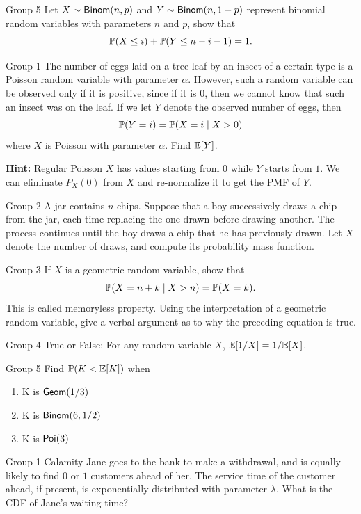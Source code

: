 \documentclass{article}
\begin{document}
\begin{problem}
    {Group 5}
    Let $X\sim\mathsf{Binom}(n,p)$ and $Y\sim\mathsf{Binom}(n,1-p)$ represent binomial random variables with parameters $n$ and $p$, show that
    \[\P{X\leq i}+\P{Y\leq n-i-1}=1.\]
\end{problem}
\begin{problem}
    {Group 1}
    The number of eggs laid on a tree leaf by an insect of a certain type is a Poisson random variable with parameter $\alpha$. However, such a random variable can be observed only if it is positive, since if it is $0$, then we cannot know that such an insect was on the leaf. If we let $Y$ denote the observed number of eggs, then
    \[\P{Y=i}=\condP{X=i}{X>0}\]
    where $X$ is Poisson with parameter $\alpha$. Find $\E{Y}$.

    \textbf{Hint:} Regular Poisson $X$ has values starting from $0$ while $Y$ starts from $1$. We can eliminate $P_X(0)$ from $X$ and re-normalize it to get the PMF of $Y$.
\end{problem}

\begin{problem}
    {Group 2}
    A jar contains $n$ chips. Suppose that a boy successively draws a chip from the jar, each time replacing the one drawn before drawing another. The process continues until the boy draws a chip that he has previously drawn. Let $X$ denote the number of draws, and compute its probability mass function.
\end{problem}

\begin{problem}
    {Group 3}
    If $X$ is a geometric random variable, show that
    \[\condP{X = n + k}{X > n} = \P{X = k}.\]
    This is called memoryless property. Using the interpretation of a geometric random variable, give a verbal argument as to why the preceding equation is true.
\end{problem}

\begin{problem}
    {Group 4}
    True or False: For any random variable $X$, $\E{1/X}=1/\E{X}$.
\end{problem}

\begin{problem}
    {Group 5}
    Find $\P{K<\E{K}}$ when
    \begin{enumerate}
        \item K is $\mathsf{Geom}(1/3)$
        \item K is $\mathsf{Binom}(6, 1/2)$
        \item K is $\mathsf{Poi}(3)$
    \end{enumerate}
\end{problem}
\begin{problem}
    {Group 1}
    Calamity Jane goes to the bank to make a withdrawal, and is equally likely to find $0$ or $1$ customers ahead of her. The service time of the customer ahead, if present, is exponentially distributed with parameter $\lambda$. What is the CDF of Jane's waiting time?
\end{problem}
\end{document}
